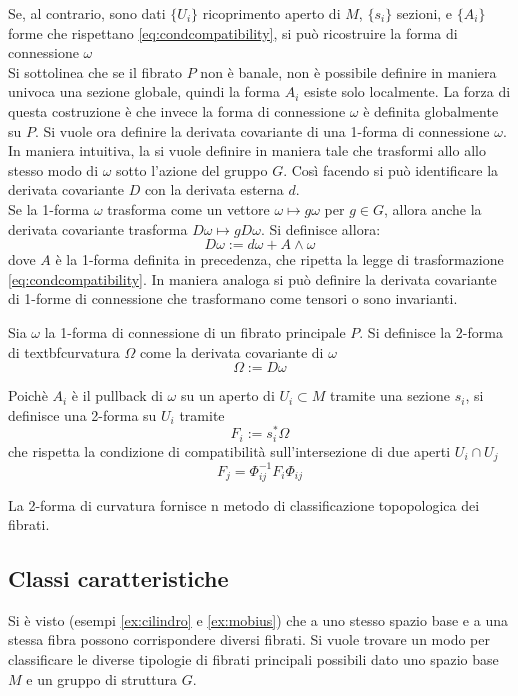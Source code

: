 Se, al contrario, sono dati $\{U_i\}$ ricoprimento aperto di $M$, $\{s_i\}$
sezioni, e $\{A_i\}$ forme che rispettano \ref{eq:condcompatibility}, si può
ricostruire la forma di connessione $\omega$\\
Si sottolinea che se il fibrato $P$ non è banale, non è possibile definire in
maniera univoca una sezione globale, quindi la forma $A_i$ esiste solo localmente.
La forza di questa costruzione è che invece la forma di connessione $\omega$
è definita globalmente su $P$.
Si vuole ora definire la derivata covariante di una
1-forma di connessione $\omega$.
In maniera intuitiva, la si vuole definire in maniera tale che trasformi allo
allo stesso modo di $\omega$ sotto l'azione del gruppo $G$. Così facendo si
può identificare la derivata covariante $D$ con la derivata esterna $d$.\\
Se la 1-forma $\omega$ trasforma come un vettore $\omega \mapsto g\omega$ per
$g \in G$, allora anche la derivata covariante trasforma $ D\omega \mapsto
g D\omega $. Si definisce allora:
   $$ D\omega := d\omega + A \wedge \omega $$
dove $A$ è la 1-forma definita in precedenza, che ripetta la legge di
trasformazione \ref{eq:condcompatibility}. In maniera analoga si può definire la
derivata covariante di 1-forme di connessione che trasformano come tensori o sono
invarianti.
\begin{definition}
   Sia $\omega$ la 1-forma di connessione di un fibrato principale $P$. Si definisce
   la 2-forma di textbf{curvatura} $\Omega$ come la derivata covariante di $\omega$
   $$ \Omega := D\omega $$
\end{definition}
Poichè $A_i$ è il pullback di $\omega$ su un aperto di $U_i \subset M$
tramite una sezione $s_i$, si definisce una 2-forma su $U_i$ tramite
\begin{equation} F_i := s_i^* \Omega \end{equation}
che rispetta la condizione di compatibilità sull'intersezione di due aperti
$U_i \cap U_j$
\begin{equation} F_j = \Phi_{ij}^{-1}F_i\Phi_{ij} \end{equation}

La 2-forma di curvatura fornisce n metodo di classificazione topopologica
dei fibrati.

\subsection{Classi caratteristiche}
Si è visto (esempi \ref{ex:cilindro} e \ref{ex:mobius}) che a uno stesso spazio
base e a una stessa fibra possono corrispondere diversi fibrati. Si vuole trovare
un modo per classificare le diverse tipologie di fibrati principali possibili dato uno
spazio base $M$ e un gruppo di struttura $G$.\\

